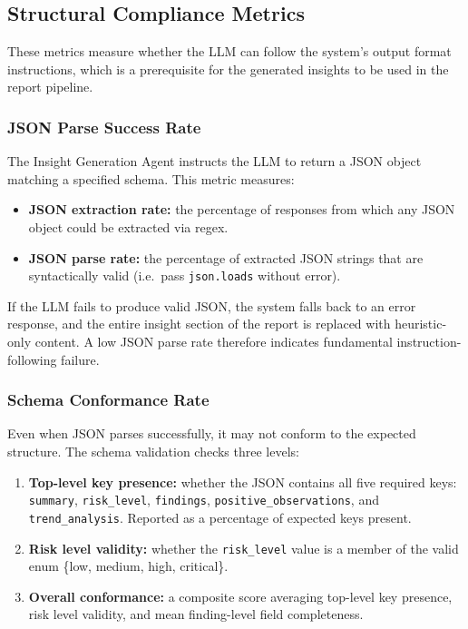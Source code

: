 \documentclass[]{UCD_CS_FYP_Report}
\begin{document}
\subsection{Structural Compliance Metrics}

These metrics measure whether the LLM can follow the system's output format instructions, which is a prerequisite for the generated insights to be used in the report pipeline.

\subsubsection{JSON Parse Success Rate}
\label{sec:json_parse}

The Insight Generation Agent instructs the LLM to return a JSON object matching a specified schema. This metric measures:

\begin{itemize}
    \item \textbf{JSON extraction rate:} the percentage of responses from which any JSON object could be extracted via regex.
    \item \textbf{JSON parse rate:} the percentage of extracted JSON strings that are syntactically valid (i.e.\ pass \texttt{json.loads} without error).
\end{itemize}

If the LLM fails to produce valid JSON, the system falls back to an error response, and the entire insight section of the report is replaced with heuristic-only content. A low JSON parse rate therefore indicates fundamental instruction-following failure.

\subsubsection{Schema Conformance Rate}
\label{sec:schema_conformance}

Even when JSON parses successfully, it may not conform to the expected structure. The schema validation checks three levels:

\begin{enumerate}
    \item \textbf{Top-level key presence:} whether the JSON contains all five required keys: \texttt{summary}, \texttt{risk\_level}, \texttt{findings}, \texttt{positive\_observations}, and \texttt{trend\_analysis}. Reported as a percentage of expected keys present.
    \item \textbf{Risk level validity:} whether the \texttt{risk\_level} value is a member of the valid enum \{low, medium, high, critical\}.
    \item \textbf{Overall conformance:} a composite score averaging top-level key presence, risk level validity, and mean finding-level field completeness.
\end{enumerate}
\end{document}
